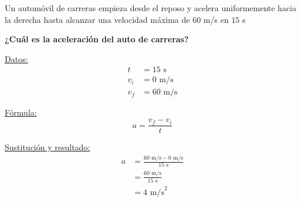Un automóvil de carreras empieza desde el reposo y acelera uniformemente hacia la derecha hasta alcanzar
una velocidad máxima de $60$ m/s en $15$ s

\textbf{¿Cuál es la aceleración del auto de carreras?}

\begin{minipage}[c]{\linewidth}
    \begin{solutionbox}{4.5cm}
        \begin{minipage}[t]{0.3\textwidth}
            \centering
            \underline{Datos:}
            \begin{align*}
                t   & =  15 \text{ s}   \\
                v_i & = 0  \text{ m/s}  \\
                v_f & = 60  \text{ m/s}
            \end{align*}
        \end{minipage}%
        \begin{minipage}[t]{0.3\textwidth}
            \centering
            \underline{F\'ormula:}
            \begin{equation*}
                a=\frac{v_f-v_i}{t}
            \end{equation*}
        \end{minipage}
        \begin{minipage}[t]{0.3\textwidth}
            \centering
            \underline{Sustituci\'on y resultado:}
            \begin{align*}
                a & =\frac{60 \text{ m/s}-0 \text{ m/s}}{15 \text{ s}} \\
                  & = \frac{60 \text{ m/s}}{15 \text{ s}}              \\
                  & =4 \text{ m/s}^2
            \end{align*}
        \end{minipage}
    \end{solutionbox}
\end{minipage}